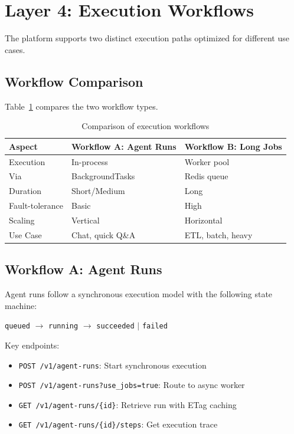 \documentclass[a4paper,twoside]{sapthesis}
\begin{document}
\section{Layer 4: Execution Workflows}
\label{sec:layer4-workflows}

The platform supports two distinct execution paths optimized for different use cases.

\subsection{Workflow Comparison}
\label{subsec:workflow-comparison}

Table~\ref{tab:workflow-comparison} compares the two workflow types.

\begin{table}[htbp]
\centering
\caption{Comparison of execution workflows}
\label{tab:workflow-comparison}
\begin{tabular}{@{}lll@{}}
\toprule
\textbf{Aspect} & \textbf{Workflow A: Agent Runs} & \textbf{Workflow B: Long Jobs} \\
\midrule
Execution & In-process & Worker pool \\
Via & BackgroundTasks & Redis queue \\
Duration & Short/Medium & Long \\
Fault-tolerance & Basic & High \\
Scaling & Vertical & Horizontal \\
Use Case & Chat, quick Q\&A & ETL, batch, heavy \\
\bottomrule
\end{tabular}
\end{table}

\subsection{Workflow A: Agent Runs}
\label{subsec:workflow-a}

Agent runs follow a synchronous execution model with the following state machine:

\begin{center}
\texttt{queued} $\rightarrow$ \texttt{running} $\rightarrow$ \texttt{succeeded} $|$ \texttt{failed}
\end{center}

Key endpoints:
\begin{itemize}
    \item \texttt{POST /v1/agent-runs}: Start synchronous execution
    \item \texttt{POST /v1/agent-runs?use\_jobs=true}: Route to async worker
    \item \texttt{GET /v1/agent-runs/\{id\}}: Retrieve run with ETag caching
    \item \texttt{GET /v1/agent-runs/\{id\}/steps}: Get execution trace
\end{itemize}
\end{document}
